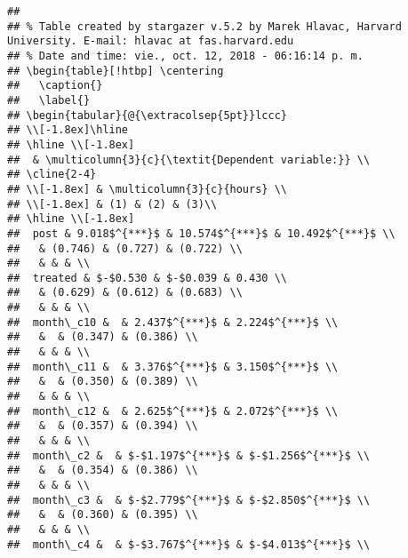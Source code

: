\documentclass[11pt,]{article}
\begin{document}
\begin{verbatim}
## 
## % Table created by stargazer v.5.2 by Marek Hlavac, Harvard University. E-mail: hlavac at fas.harvard.edu
## % Date and time: vie., oct. 12, 2018 - 06:16:14 p. m.
## \begin{table}[!htbp] \centering 
##   \caption{} 
##   \label{} 
## \begin{tabular}{@{\extracolsep{5pt}}lccc} 
## \\[-1.8ex]\hline 
## \hline \\[-1.8ex] 
##  & \multicolumn{3}{c}{\textit{Dependent variable:}} \\ 
## \cline{2-4} 
## \\[-1.8ex] & \multicolumn{3}{c}{hours} \\ 
## \\[-1.8ex] & (1) & (2) & (3)\\ 
## \hline \\[-1.8ex] 
##  post & 9.018$^{***}$ & 10.574$^{***}$ & 10.492$^{***}$ \\ 
##   & (0.746) & (0.727) & (0.722) \\ 
##   & & & \\ 
##  treated & $-$0.530 & $-$0.039 & 0.430 \\ 
##   & (0.629) & (0.612) & (0.683) \\ 
##   & & & \\ 
##  month\_c10 &  & 2.437$^{***}$ & 2.224$^{***}$ \\ 
##   &  & (0.347) & (0.386) \\ 
##   & & & \\ 
##  month\_c11 &  & 3.376$^{***}$ & 3.150$^{***}$ \\ 
##   &  & (0.350) & (0.389) \\ 
##   & & & \\ 
##  month\_c12 &  & 2.625$^{***}$ & 2.072$^{***}$ \\ 
##   &  & (0.357) & (0.394) \\ 
##   & & & \\ 
##  month\_c2 &  & $-$1.197$^{***}$ & $-$1.256$^{***}$ \\ 
##   &  & (0.354) & (0.386) \\ 
##   & & & \\ 
##  month\_c3 &  & $-$2.779$^{***}$ & $-$2.850$^{***}$ \\ 
##   &  & (0.360) & (0.395) \\ 
##   & & & \\ 
##  month\_c4 &  & $-$3.767$^{***}$ & $-$4.013$^{***}$ \\ 

\end{verbatim}
\end{document}
